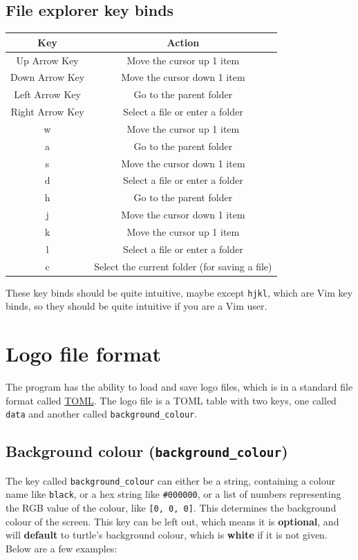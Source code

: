 \documentclass[11pt]{article}
\begin{document}
\subsection{File explorer key binds}
\label{sec:org883e4d0}
\begin{center}
\begin{tabular}{|c|c|}
\hline
Key & Action\\[0pt]
\hline
Up Arrow Key & Move the cursor up 1 item\\[0pt]
Down Arrow Key & Move the cursor down 1 item\\[0pt]
Left Arrow Key & Go to the parent folder\\[0pt]
Right Arrow Key & Select a file or enter a folder\\[0pt]
w & Move the cursor up 1 item\\[0pt]
a & Go to the parent folder\\[0pt]
s & Move the cursor down 1 item\\[0pt]
d & Select a file or enter a folder\\[0pt]
h & Go to the parent folder\\[0pt]
j & Move the cursor down 1 item\\[0pt]
k & Move the cursor up 1 item\\[0pt]
l & Select a file or enter a folder\\[0pt]
c & Select the current folder (for saving a file)\\[0pt]
\hline
\end{tabular}
\end{center}

 \noindent These key binds should be quite intuitive, maybe except \texttt{hjkl}, which are Vim key binds, so they should be quite intuitive if you are a Vim user.


\section{Logo file format}
\label{sec:org7c5e25c}
The program has the ability to load and save logo files, which is in a standard file format called \href{https://toml.io/en/}{TOML}. The logo file is a TOML table with two keys, one called \texttt{data} and another called \texttt{background\_colour}.

\subsection{Background colour (\texttt{background\_colour})}
\label{sec:orgba14525}
The key called \texttt{background\_colour} can either be a string, containing a colour name like \texttt{black}, or a hex string like \texttt{\#000000}, or a list of numbers representing the RGB value of the colour, like \texttt{[0, 0, 0]}. This determines the background colour of the screen. This key can be left out, which means it is \textbf{optional}, and will \textbf{default} to turtle's background colour, which is \textbf{white} if it is not given. Below are a few examples:
\end{document}
